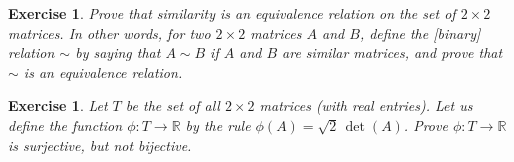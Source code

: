 \documentclass{book}
\newcounter{ekcounter}%
\theoremstyle{ekimcustom}
\newtheorem{exercise}[ekcounter]{Exercise}
\begin{document}
\begin{exercise}
Prove that similarity is an equivalence relation on the set of $2 \times 2$ matrices. In other words, for two $2 \times 2$ matrices $A$ and $B$, define the [binary] relation $\sim$ by saying that $A \sim B$ if $A$ and $B$ are similar matrices, and prove that $\sim$ is an equivalence relation.
\end{exercise}

\begin{exercise}
Let $T$ be the set of all $2 \times 2$ matrices (with real entries). Let us define the function $\phi : T \to \mathbb{R}$ by the rule $\phi(A)= \sqrt{2}\,\det(A)$. Prove $\phi : T \to \mathbb{R}$ is surjective, but not bijective.
\end{exercise}


\printindex
\end{document}
